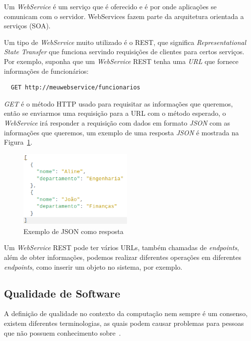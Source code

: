 \documentclass[12pt]{article}
\begin{document}
Um \textit{WebService} é um serviço que é oferecido e é por onde aplicações se comunicam com o servidor.
WebServices fazem parte da arquitetura orientada a serviços (SOA).

Um tipo de \textit{WebService} muito utilizado é o REST, que significa
\emph{Representational State Transfer} que funciona servindo requisições de clientes
para certos serviços. Por exemplo, suponha que um \textit{WebService} REST tenha uma \textit{URL} que fornece
informações de funcionários:

\begin{verbatim}
  GET http://meuwebservice/funcionarios
\end{verbatim}

\textit{GET} é o método HTTP usado para requisitar as informações que queremos, então se enviarmos uma requisição
para a URL com o método esperado, o \textit{WebService} irá responder a requisição com dados em formato \textit{JSON}
com as informações que queremos, um exemplo de uma resposta \textit{JSON} é mostrada na Figura~\ref{fig:json}.

\begin{figure}[h]
    \centering
    \includegraphics[width=0.5\textwidth]{code/json.png}
    \caption{Exemplo de JSON como resposta}\label{fig:json}
\end{figure}

Um \textit{WebService} REST pode ter vários URLs, também chamadas de \textit{endpoints}, além de obter informações, podemos realizar
diferentes operações em diferentes \textit{endpoints}, como inserir um objeto no sistema, por exemplo.

\subsection{Qualidade de Software}

A definição de qualidade no contexto da computação nem sempre é um consenso,
existem diferentes terminologias, as quais podem causar problemas para pessoas que não
possuem conhecimento sobre~\cite{Duarte03}.
\end{document}
